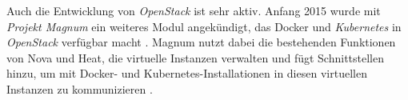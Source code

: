 \documentclass[../main.tex]{subfiles}
\begin{document}
    Auch die Entwicklung von \emph{OpenStack} ist sehr aktiv. Anfang 2015 wurde mit \emph{Projekt Magnum} ein weiteres Modul angekündigt, das Docker und \emph{Kubernetes} in \emph{OpenStack} verfügbar macht \cite{https://wiki.openstack.org/wiki/Magnum}. Magnum nutzt dabei die bestehenden Funktionen von Nova und Heat, die virtuelle Instanzen verwalten und fügt Schnittstellen hinzu, um mit Docker- und Kubernetes-Installationen in diesen virtuellen Instanzen zu kommunizieren \cite{https://wiki.openstack.org/wiki/Magnum}.






\end{document}

